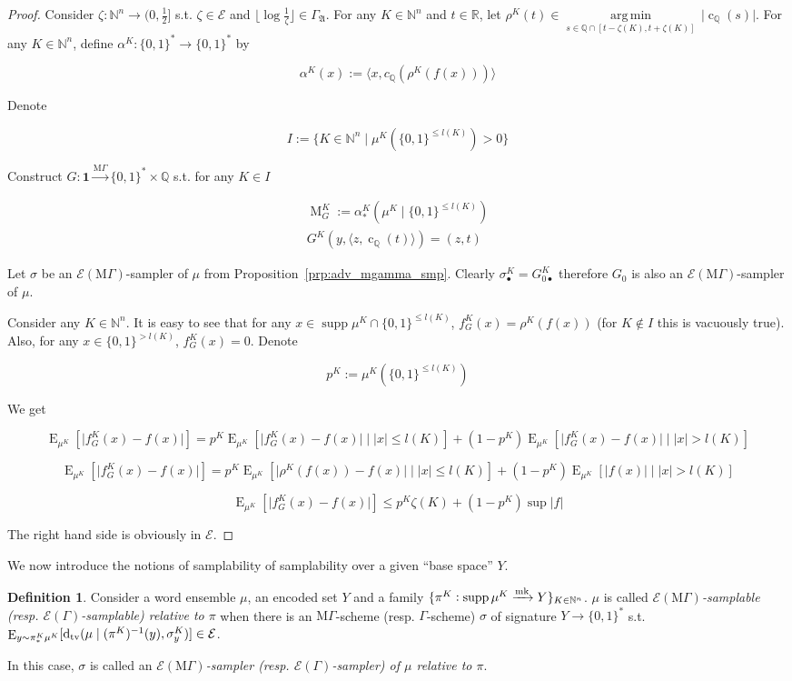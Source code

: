 \documentclass{article}
\numberwithin{equation}{section}
\theoremstyle{definition}
\newtheorem{definition}{Definition}[section]
\theoremstyle{plain}
\newcommand{\Bool}{\{0,1\}}
\newcommand{\Words}{{\Bool^*}}
\DeclareMathOperator{\Supp}{supp}
\DeclareMathOperator{\E}{E}
\DeclareMathOperator{\M}{M}
\DeclareMathOperator{\En}{c}
\newcommand{\Dtv}{\operatorname{d}_{\textnormal{tv}}}
\newcommand{\Argmin}[1]{\underset{#1}{\operatorname{arg\,min}}\,}
\newcommand{\Nats}{\mathbb{N}}
\newcommand{\Rats}{\mathbb{Q}}
\newcommand{\Reals}{\mathbb{R}}
\newcommand{\Abs}[1]{\lvert #1 \rvert}
\newcommand{\Floor}[1]{\lfloor #1 \rfloor}
\newcommand{\Chev}[1]{\langle #1 \rangle}
\newcommand{\GrowA}{\Gamma_{\mathfrak{A}}}
\newcommand{\MGrow}{\mathrm{M}\Gamma}
\newcommand{\Fall}{\mathcal{E}}
\newcommand{\EG}{\Fall(\Gamma)}
\newcommand{\EMG}{\Fall(\MGrow)}
\newcommand{\Markov}{\xrightarrow{\textnormal{mk}}}
\newcommand{\MScheme}{\xrightarrow{\MGrow}}
\begin{document}
\begin{proof}

Consider $\zeta: \Nats^n \rightarrow (0,\frac{1}{2}]$ s.t.  $\zeta \in \Fall$ and $\Floor{\log \frac{1}{\zeta}} \in \GrowA$. For any $K \in \Nats^n$ and ${t \in \Reals}$, let ${\rho^K(t) \in \Argmin{s \in \Rats \cap [t-\zeta(K),t+\zeta(K)]} \Abs{\En_\Rats(s)}}$. For any $K \in \Nats^n$, define ${\alpha^K: \Words \rightarrow \Words}$ by 

\[\alpha^K(x):=\Chev{x,c_\Rats(\rho^K(f(x)))}\]

Denote 

\[I:=\{K \in \Nats^n \mid \mu^{K}(\Bool^{\leq l(K)}) > 0\}\]

Construct ${G: \bm{1} \MScheme \Words \times \Rats}$ s.t. for any $K \in I$

\begin{align*}
\M_G^K:=\alpha_*^K(\mu^{K} \mid \Bool^{\leq l(K)}) \\
G^K(y,\Chev{z,\En_\Rats(t)})=(z,t)
\end{align*}

Let $\sigma$ be an $\EMG$-sampler of $\mu$ from Proposition~\ref{prp:adv_mgamma_smp}. Clearly $\sigma_{\bullet}^K=G_{0\bullet}^K$ therefore $G_0$ is also an $\EMG$-sampler of $\mu$.

Consider any $K \in \Nats^n$. It is easy to see that for any ${x \in \Supp \mu^{K} \cap \Bool^{\leq l(K)}}$, ${f_G^K(x)=\rho^K(f(x))}$ (for $K \not\in I$ this is vacuously true). Also, for any ${x \in \Bool^{>l(K)}}$, $f_G^K(x)=0$. Denote 

\[p^K:=\mu^{K}(\Bool^{\leq l(K)})\]

We get

$$\E_{\mu^{K}}[\Abs{f_G^K(x)-f(x)}]=p^K \E_{\mu^{K}}[\Abs{f_G^K(x)-f(x)} \mid \Abs{x} \leq l(K)] + (1 - p^K)\E_{\mu^{K}}[\Abs{f_G^K(x)-f(x)} \mid \Abs{x} > l(K)]$$

$$\E_{\mu^{K}}[\Abs{f_G^K(x)-f(x)}]=p^K \E_{\mu^{K}}[\Abs{\rho^K(f(x))-f(x)} \mid \Abs{x} \leq l(K)] + (1 - p^K)\E_{\mu^{K}}[\Abs{f(x)} \mid \Abs{x} > l(K)]$$

$$\E_{\mu^{K}}[\Abs{f_G^K(x)-f(x)}] \leq p^K \zeta(K) + (1 - p^K)\sup \Abs{f}$$

The right hand side is obviously in $\Fall$.
\end{proof}

We now introduce the notions of samplability of samplability over a given \enquote{base space} $Y$.

\begin{definition}

Consider a word ensemble $\mu$, an encoded set $Y$ and a family ${\{\pi^K: \Supp \mu^{K} \Markov Y\}_{K \in \Nats^n}}$. $\mu$ is called \emph{$\EMG$-samplable (resp. $\EG$-samplable) relative to $\pi$} when there is an $\MGrow$-scheme (resp. $\Gamma$-scheme) $\sigma$ of signature $Y \rightarrow \Words$ s.t. ${\E_{y \sim \pi_*^K\mu^{K}}[\Dtv(\mu \mid (\pi^K)^{-1}(y),\sigma_y^K)] \in \Fall}$.

In this case, $\sigma$ is called an \emph{$\EMG$-sampler (resp. $\EG$-sampler) of $\mu$ relative to $\pi$}.

\end{definition}
\end{document}
